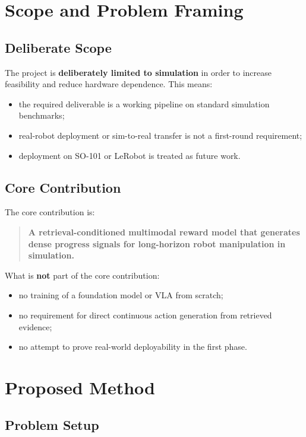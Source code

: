 \section{Scope and Problem Framing}

\subsection{Deliberate Scope}

The project is \textbf{deliberately limited to simulation} in order to increase feasibility and reduce hardware dependence.
This means:
\begin{itemize}
  \item the required deliverable is a working pipeline on standard simulation benchmarks;
  \item real-robot deployment or sim-to-real transfer is not a first-round requirement;
  \item deployment on SO-101 or LeRobot is treated as future work.
\end{itemize}

\subsection{Core Contribution}

The core contribution is:
\begin{quote}
  \textbf{A retrieval-conditioned multimodal reward model that generates dense progress signals for long-horizon robot manipulation in simulation.}
\end{quote}

What is \textbf{not} part of the core contribution:
\begin{itemize}
  \item no training of a foundation model or VLA from scratch;
  \item no requirement for direct continuous action generation from retrieved evidence;
  \item no attempt to prove real-world deployability in the first phase.
\end{itemize}

\section{Proposed Method}

\subsection{Problem Setup}

